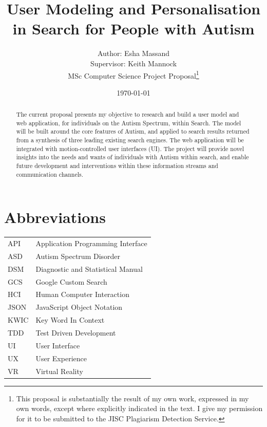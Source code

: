 \documentclass[a4paper, 10pt]{article}
\begin{document}
\title{User Modeling and Personalisation in Search for People with Autism}
\author{Author: Esha Massand\\Supervisor: Keith Mannock\\
MSc Computer Science Project Proposal\footnote{This proposal is substantially the result of my own work, expressed in my own words, except where explicitly indicated in the text. I give my permission for it to be submitted to the JISC Plagiarism Detection Service. }}
\date{\today}
\maketitle


\begin{abstract}
The current proposal presents my objective to research and build a user model and web application, for individuals on the Autism Spectrum, within Search. The model will be built around the core features of Autism, and applied to search results returned from a synthesis of three leading existing search engines. The web application will be integrated with motion-controlled user interfaces (UI). The project will provide novel insights into the needs and wants of individuals with Autism within search, and enable future development and interventions within these information streams and communication channels.
\end{abstract}


\tableofcontents

\section{Abbreviations}
\begin{tabular}{l l }
API & Application Programming Interface\\
ASD & Autism Spectrum Disorder\\
DSM & Diagnostic and Statistical Manual\\
GCS & Google Custom Search\\
HCI & Human Computer Interaction\\
JSON & JavaScript Object Notation\\
KWIC & Key Word In Context\\
TDD & Test Driven Development\\
UI & User Interface\\
UX & User Experience\\
VR & Virtual Reality\\
\end{tabular}
\end{document}
